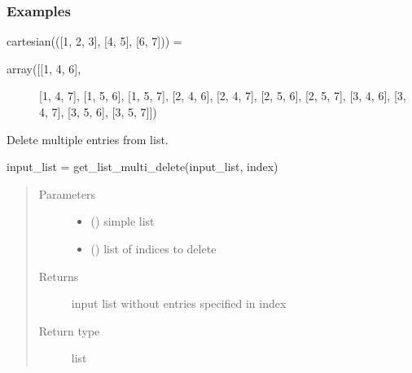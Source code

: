 \documentclass[letterpaper,10pt,english,openany,oneside]{sphinxmanual}
\begin{document}
\begin{fulllineitems}
\subsubsection*{Examples}

cartesian(({[}1, 2, 3{]}, {[}4, 5{]}, {[}6, 7{]})) =
\begin{description}
\item[{array({[}{[}1, 4, 6{]},}] \leavevmode
{[}1, 4, 7{]},
{[}1, 5, 6{]},
{[}1, 5, 7{]},
{[}2, 4, 6{]},
{[}2, 4, 7{]},
{[}2, 5, 6{]},
{[}2, 5, 7{]},
{[}3, 4, 6{]},
{[}3, 4, 7{]},
{[}3, 5, 6{]},
{[}3, 5, 7{]}{]})

\end{description}

\end{fulllineitems}


\begin{fulllineitems}
\label{\detokenize{pygpc:pygpc.misc.get_list_multi_delete}}
Delete multiple entries from list.

input\_list = get\_list\_multi\_delete(input\_list, index)
\begin{quote}\begin{description}
\item[{Parameters}] \leavevmode\begin{itemize}
\item {} 
 () \textendash{} simple list

\item {} 
 () \textendash{} list of indices to delete

\end{itemize}

\item[{Returns}] \leavevmode
{} \textendash{} input list without entries specified in index

\item[{Return type}] \leavevmode
list

\end{description}\end{quote}

\end{fulllineitems}
\end{document}

